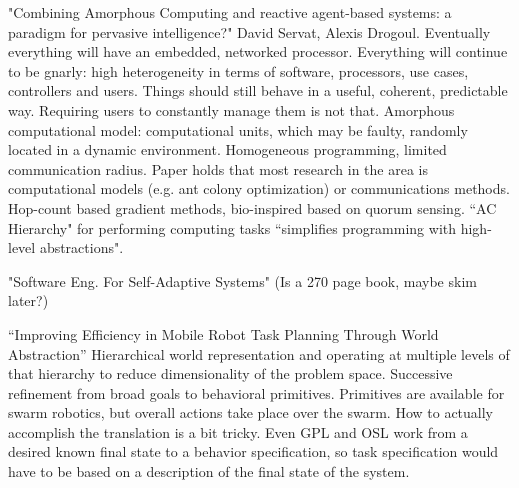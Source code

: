 \documentclass[]{article}
\begin{document}

"Combining Amorphous Computing and reactive agent-based systems: a paradigm for pervasive intelligence?" David Servat, Alexis Drogoul. Eventually everything will have an embedded, networked processor. Everything will continue to be gnarly: high heterogeneity in terms of software, processors, use cases, controllers and users. Things should still behave in a useful, coherent, predictable way. Requiring users to constantly manage them is not that. Amorphous computational model: computational units, which may be faulty, randomly located in a dynamic environment. Homogeneous programming, limited communication radius. Paper holds that most research in the area is computational models (e.g. ant colony optimization) or communications methods. Hop-count based gradient methods, bio-inspired based on quorum sensing. ``AC Hierarchy" for performing computing tasks ``simplifies programming with high-level abstractions". 

"Software Eng. For Self-Adaptive Systems" (Is a 270 page book, maybe skim later?)

``Improving Efficiency in Mobile Robot Task Planning Through World Abstraction'' \cite{galindo2004improving} Hierarchical world representation and operating at multiple levels of that hierarchy to reduce dimensionality of the problem space. Successive refinement from broad goals to behavioral primitives. Primitives are available for swarm robotics, but overall actions take place over the swarm. How to actually accomplish the translation is a bit tricky. Even GPL and OSL work from a desired known final state to a behavior specification, so task specification would have to be based on a description of the final state of the system. 
\end{document}
